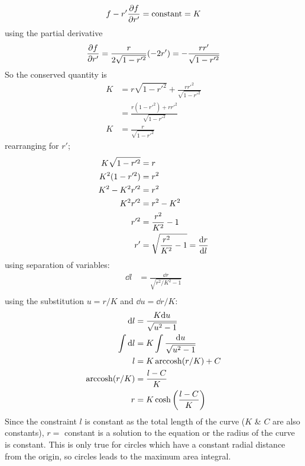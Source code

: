 \documentclass[../hw.tex]{subfiles}
\begin{document}
\begin{align*}
    f - r' \pdv{f}{r'} = \mathrm{constant} = K
\end{align*}
using the partial derivative
\begin{align*}
    \pdv{f}{r'} = \frac{r}{2\sqrt{1 - r'^2}} (-2r') = -\frac{r r'}{\sqrt{1 - r'^2}}
\end{align*}
So the conserved quantity is
\begin{align*}
    K &= r\sqrt{1 - r'^2} + \frac{r r'^2}{\sqrt{1 - r'^2}} \\
    &= \frac{r(1 - r'^2) + r r'^2}{\sqrt{1 - r'^2}} \\
    K &= \frac{r}{\sqrt{1 - r'^2}}
\end{align*}
rearranging for $r'$;
\begin{align*}
    K\sqrt{1 - r'^2} &= r \\
    K^2(1 - r'^2) &= r^2 \\
    K^2 - K^2 r'^2 &= r^2 \\
    K^2 r'^2 &= r^2 - K^2 \\
    r'^2 &= \frac{r^2}{K^2} - 1\\
    r' &= \sqrt{\frac{r^2}{K^2} - 1} = \dv{r}{l} 
\end{align*}
using separation of variables:
\begin{align*}
    \dd l &= \frac{\dd r}{\sqrt{r^2/K^2 - 1}} \\
\end{align*}
using the substitution $u = r/K$ and $\dd u = \dd r/K$:
\begin{align*}
    \dd l &= \frac{K \dd u}{\sqrt{u^2 - 1}} \\
    \int \dd l &= K \int \frac{\dd u}{\sqrt{u^2 - 1}} \\
    l &= K \arccosh(r/K) + C \\
    \arccosh(r/K) &= \frac{l - C}{K} \\
    r &= K \cosh\qt(\frac{l - C}{K})
\end{align*}
Since the constraint $l$ is constant as the total length of the curve ($K$ \& $C$ are also
constants), $r =$ constant is a solution to the equation or the radius of the curve is constant.
This is only true for circles which have a constant radial distance from the origin, so circles
leads to the maximum area integral. 
\newpage
\end{document}
